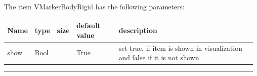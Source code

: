 The item VMarkerBodyRigid has the following parameters:\vspace{-1cm}\\ 
\begin{center}
  \footnotesize
  \begin{longtable}{| p{4.5cm} | p{2.5cm} | p{0.5cm} | p{2.5cm} | p{6cm} |}
    \hline
    \bf Name & \bf type & \bf size & \bf default value & \bf description \\ \hline
    show &     Bool &      &     True &     set true, if item is shown in visualization and false if it is not shown\\ \hline
	  \end{longtable}
	\end{center}
\par\noindent\rule{\textwidth}{0.4pt}
\label{description_MarkerBodyRigid}
